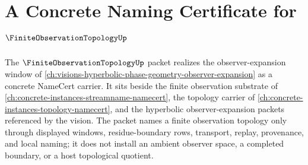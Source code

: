 \chapter{A Concrete Naming Certificate for $\FiniteObservationTopologyUp$}
\label{ch:concrete-instances-finite-observation-topology-namecert}

The $\FiniteObservationTopologyUp$ packet realizes the observer-expansion window of \autoref{ch:visions-hyperbolic-phase-geometry-observer-expansion} as a concrete NameCert carrier. It sits beside the finite observation substrate of \autoref{ch:concrete-instances-streamname-namecert}, the topology carrier of \autoref{ch:concrete-instances-topology-namecert}, and the hyperbolic observer-expansion packets referenced by the vision. The packet names a finite observation topology only through displayed windows, residue-boundary rows, transport, replay, provenance, and local naming; it does not install an ambient observer space, a completed boundary, or a host topological quotient.


